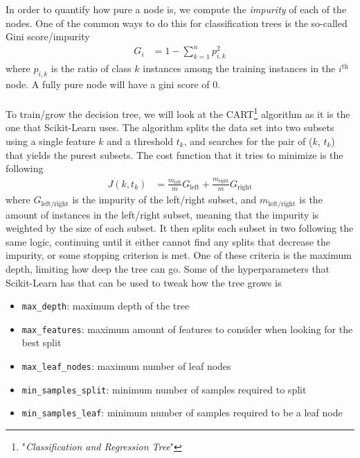 \documentclass[a4paper]{article}
\begin{document}
In order to quantify how pure a node is, we compute the \textit{impurity} of each of the nodes. One of the common ways to do this for classification trees is the so-called Gini score/impurity
\begin{align*}
	G_i &= 1 - \sum_{k=1}^n p_{i,k}^2
\end{align*}
where $p_{i,k}$ is the ratio of class $k$ instances among the training instances in the $i^{\text{th}}$ node. A fully pure node will have a gini score of 0. 
\\\\
To train/grow the decision tree, we will look at the CART\footnote{"\textit{Classification and
Regression Tree}"} algorithm as it is the one that Scikit-Learn uses. The algorithm splits the data set into two subsets using a single feature $k$ and a threshold $t_k$, and searches for the pair of ($k$, $t_k$) that yields the purest subsets. The cost function that it tries to minimize is the following
\begin{align*}
	J(k, t_k) &= \frac{m_{\text{left}}}{m}G_{\text{left}} + \frac{m_{\text{right}}}{m}G_{\text{right}}
\end{align*}
where $G_{\text{left/right}}$ is the impurity of the left/right subset, and $m_{\text{left/right}}$ is the amount of instances in the left/right subset, meaning that the impurity is weighted by the size of each subset. It then splits each subset in two following the same logic, continuing until it either cannot find any splits that decrease the impurity, or some stopping criterion is met. One of these criteria is the maximum depth, limiting how deep the tree can go. Some of the hyperparameters that Scikit-Learn has that can be used to tweak how the tree grows is
\begin{itemize}
	\item\texttt{max\_depth}: maximum depth of the tree
	\item\texttt{max\_features}: maximum amount of features to consider when looking for the best split
	\item\texttt{max\_leaf\_nodes}: maximum number of leaf nodes
	\item\texttt{min\_samples\_split}: minimum number of samples required to split
	\item\texttt{min\_samples\_leaf}: minimum number of samples required to be a leaf node
\end{itemize}
\end{document}
